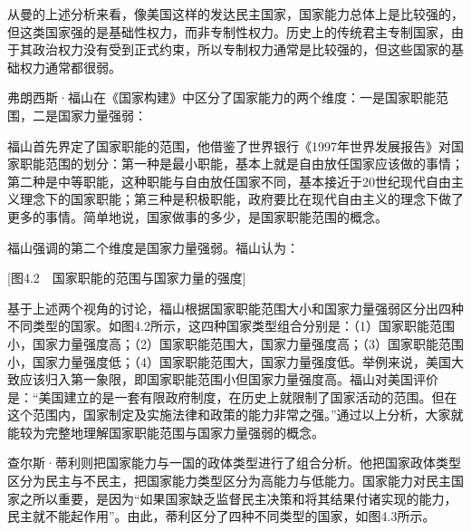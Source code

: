 从曼的上述分析来看，像美国这样的发达民主国家，国家能力总体上是比较强的，但这类国家强的是基础性权力，而非专制性权力。历史上的传统君主专制国家，由于其政治权力没有受到正式约束，所以专制权力通常是比较强的，但这些国家的基础权力通常都很弱。

弗朗西斯·福山在《国家构建》中区分了国家能力的两个维度：一是国家职能范围，二是国家力量强弱：


福山首先界定了国家职能的范围，他借鉴了世界银行《1997年世界发展报告》对国家职能范围的划分：第一种是最小职能，基本上就是自由放任国家应该做的事情；第二种是中等职能，这种职能与自由放任国家不同，基本接近于20世纪现代自由主义理念下的国家职能；第三种是积极职能，政府要比在现代自由主义的理念下做了更多的事情。简单地说，国家做事的多少，是国家职能范围的概念。

福山强调的第二个维度是国家力量强弱。福山认为：


[图4.2　国家职能的范围与国家力量的强度]

基于上述两个视角的讨论，福山根据国家职能范围大小和国家力量强弱区分出四种不同类型的国家。如图4.2所示，这四种国家类型组合分别是：（1）国家职能范围小，国家力量强度高；（2）国家职能范围大，国家力量强度高；（3）国家职能范围小，国家力量强度低；（4）国家职能范围大，国家力量强度低。举例来说，美国大致应该归入第一象限，即国家职能范围小但国家力量强度高。福山对美国评价是：“美国建立的是一套有限政府制度，在历史上就限制了国家活动的范围。但在这个范围内，国家制定及实施法律和政策的能力非常之强。”通过以上分析，大家就能较为完整地理解国家职能范围与国家力量强弱的概念。

查尔斯·蒂利则把国家能力与一国的政体类型进行了组合分析。他把国家政体类型区分为民主与不民主，把国家能力类型区分为高能力与低能力。国家能力对民主国家之所以重要，是因为“如果国家缺乏监督民主决策和将其结果付诸实现的能力，民主就不能起作用”。由此，蒂利区分了四种不同类型的国家，如图4.3所示。

